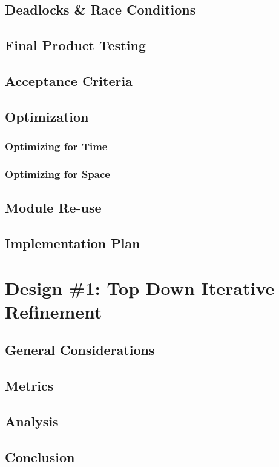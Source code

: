 \documentclass{article}
\begin{document}
	\subsection{Deadlocks \& Race Conditions}
	\subsection{Final Product Testing}
	\subsection{Acceptance Criteria}
	\subsection{Optimization}
		\subsubsection{Optimizing for Time}
		\subsubsection{Optimizing for Space}
	\subsection{Module Re-use}
	\subsection{Implementation Plan}
%
%
\section{Design \#1: Top Down Iterative Refinement}
	\subsection{General Considerations}
	\subsection{Metrics}
	\subsection{Analysis}
	\subsection{Conclusion}
%
%
\end{document}
